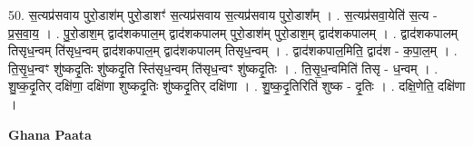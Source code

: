 \documentclass[17pt]{extarticle}
\begin{document}
50. स॒त्यप्र॑सवाय पुरो॒डाश॑म् पुरो॒डाशꣳ॑ स॒त्यप्र॑सवाय स॒त्यप्र॑सवाय पुरो॒डाश᳚म् । . स॒त्यप्र॑सवा॒येति॑ स॒त्य - प्र॒स॒वा॒य॒ । . पु॒रो॒डाश॒म् द्वाद॑शकपाल॒म् द्वाद॑शकपालम् पुरो॒डाश॑म् पुरो॒डाश॒म् द्वाद॑शकपालम् । . द्वाद॑शकपालम् तिसृध॒न्वम् ति॑सृध॒न्वम् द्वाद॑शकपाल॒म् द्वाद॑शकपालम् तिसृध॒न्वम् । . द्वाद॑शकपाल॒मिति॒ द्वाद॑श - क॒पा॒ल॒म् । . ति॒सृ॒ध॒न्वꣳ शु॑ष्कदृ॒तिः शु॑ष्कदृ॒ति स्ति॑सृध॒न्वम् ति॑सृध॒न्वꣳ शु॑ष्कदृ॒तिः । . ति॒सृ॒ध॒न्वमिति॑ तिसृ - ध॒न्वम् । . शु॒ष्क॒दृ॒तिर् दक्षि॑णा॒ दक्षि॑णा शुष्कदृ॒तिः शु॑ष्कदृ॒तिर् दक्षि॑णा । . शु॒ष्क॒दृ॒तिरिति॑ शुष्क - दृ॒तिः । . दक्षि॒णेति॒ दक्षि॑णा । \newline

\textbf{Ghana Paata } \newline
\end{document}
